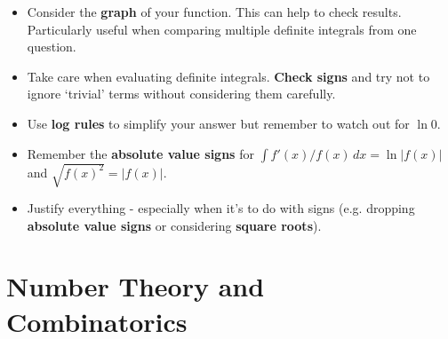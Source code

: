 \documentclass[9pt]{extarticle}
\begin{document}
\begin{itemize}
		\item Consider the \textbf{graph} of your function. This can help to check results. Particularly useful when comparing multiple definite integrals from one question.
		\item Take care when evaluating definite integrals. \textbf{Check signs} and try not to ignore `trivial' terms without considering them carefully.
		\item Use \textbf{log rules} to simplify your answer but remember to watch out for $\ln 0$.
		\item Remember the \textbf{absolute value signs} for $\int f'(x)/f(x) \,dx = \ln|f(x)|$ and $\sqrt{f(x)^2} = |f(x)|$.
		\item Justify everything - especially when it's to do with signs (e.g. dropping \textbf{absolute value signs} or considering \textbf{square roots}).
	\end{itemize}
	
	\section{Number Theory and Combinatorics}
	
\end{document}
